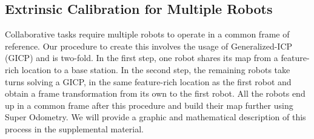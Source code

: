 \documentclass[10pt,twocolumn,letterpaper]{article}
\begin{document}
\subsection{Extrinsic Calibration for Multiple Robots}\label{sec:extrinsic_calib_robots}
Collaborative tasks require multiple robots to operate in a common frame of reference. Our procedure to create this involves the usage of Generalized-ICP (GICP)\cite{segal2009generalized} and is two-fold. In the first step, one robot shares its map from a feature-rich location to a base station. In the second step, the remaining robots take turns solving a GICP, in the same feature-rich location as the first robot and obtain a frame transformation from its own to the first robot. All the robots end up in a common frame after this procedure and build their map further using Super Odometry\cite{zhao2021super}. We will provide a graphic and mathematical description of this process in the supplemental material.






\end{document}
